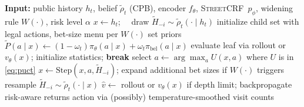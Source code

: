 \documentclass[10pt]{article}
\newcommand{\sCRF}{\textsc{Street\textendash CRF}\xspace} %
\newcommand{\1}{\mathbf{1}}
\theoremstyle{plain}
\begin{document}
\begin{algorithm}[t]
\caption{IS\textendash RS Belief\textendash MCTS\textendash \sCRF\ (selection $\to$ expansion $\to$ evaluation)}
\label{alg:bmcrf}
\begin{algorithmic}[1]
\State \textbf{Input:} public history $h_t$, belief $\tilde\rho_t$ (CPB), encoder $f_\theta$, \sCRF\ $p_\phi$, widening rule $W(\cdot)$, risk level $\alpha$
  \State $x \gets h_t$; \ \ draw $\tilde H_{-i}\sim \tilde\rho_t(\cdot\mid h_t)$
      \State initialize child set with legal actions, bet-size menu per $W(\cdot)$
      \State set priors $\tilde P(a\mid x)\leftarrow (1-\omega_t)\pi_\theta(a\mid x)+\omega_t \pi_{\text{bel}}(a\mid x)$
      \State evaluate leaf via rollout or $v_\theta(x)$; initialize statistics; \textbf{break}
    \Else
      \State select $a \leftarrow \arg\max_{a} U(x,a)$ where $U$ is in \cref{eq:puct}
      \State $x \leftarrow \text{Step}(x,a,\tilde H_{-i})$; expand additional bet sizes if $W(\cdot)$ triggers
         \State resample $\tilde H_{-i}\sim \tilde\rho_t(\cdot\mid x)$
      \EndIf
    \EndIf
  \EndWhile
  \State $\hat v \leftarrow$ rollout or $v_\theta(x)$ if depth limit; backpropagate risk-aware returns
\EndFor
\State \Return action via (possibly) temperature-smoothed visit counts
\end{algorithmic}
\end{algorithm}
\end{document}
